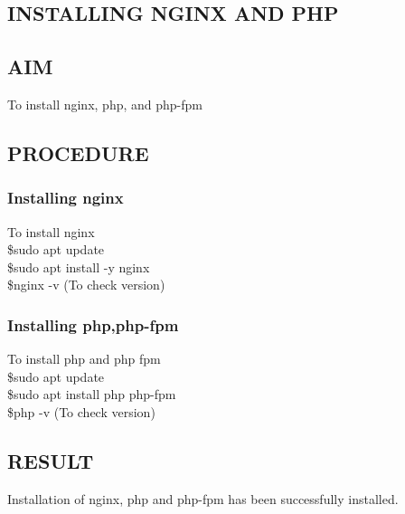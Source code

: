 \documentclass{article}
\begin{document}
\newpage
{}
\begin{verbatim}
\end{verbatim}
\newpage
{}
\begin{flushleft}
\section{INSTALLING NGINX AND PHP}
\hrulefill
\vspace{1cm}
\subsection{AIM}
To install  nginx, php, and php-fpm
\subsection{PROCEDURE}
\vspace{0.2in}
\subsubsection{Installing  nginx}
\textbullet To install nginx\\
\vspace{0.1in}\hspace{0.3in}\$sudo apt update\\
\vspace{0.1in}\hspace{0.3in}\$sudo apt install -y nginx\\
\vspace{0.1in}\hspace{0.3in}\$nginx -v (To check version)
\vspace{0.2in}\subsubsection{Installing php,php-fpm}
\textbullet To install php and php fpm\\
\vspace{0.1in}\hspace{0.3in}\$sudo apt update\\
\vspace{0.1in}\hspace{0.3in}\$sudo apt install php php-fpm\\
\vspace{0.1in}\hspace{0.3in}\$php -v (To check version)
\vspace{2in}
\subsection{RESULT}
Installation of nginx, php and php-fpm has been successfully installed.
\end{flushleft}
\newpage
{}
\end{document}

